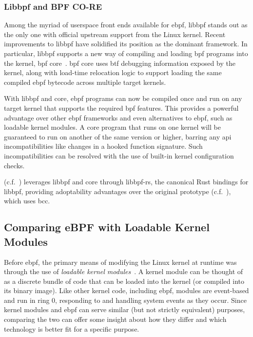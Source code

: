 \subsubsection*{Libbpf and BPF CO-RE}%

Among the myriad of userspace front ends available for \gls{ebpf}, libbpf stands out as the only
one with official upstream support from the Linux kernel. Recent improvements to libbpf
have solidified its position as the dominant framework. In particular, libbpf supports
a new way of compiling and loading \gls{bpf} programs into the kernel, \gls{bpf}
\gls{core}~\cite{gregg2020_core, nakryiko2020_core}. \gls{bpf} \gls{core} uses \gls{btf}
debugging information exposed by the kernel, along with load-time relocation logic to
support loading the same compiled \gls{ebpf} bytecode across multiple target kernels.

With libbpf and \gls{core}, \gls{ebpf} programs can now be compiled once and run on any target kernel
that supports the required \gls{bpf} features. This provides a powerful advantage over other
\gls{ebpf} frameworks and even alternatives to \gls{ebpf}, such as loadable kernel modules. A \gls{core}
program that runs on one kernel will be guaranteed to run on another of the same version
or higher, barring any \gls{api} incompatibilities like changes in a hooked function signature.
Such incompatibilities can be resolved with the use of built-in kernel configuration
checks.

\bpfcontain{} (c.f.\ ) leverages libbpf and \gls{core} through libbpf-rs, the
canonical Rust bindings for libbpf, providing adoptability advantages over the original
\bpfbox{} prototype (c.f.\ ), which uses bcc.

\subsection{Comparing eBPF with Loadable Kernel Modules}%
\label{ss:bpf-vs-modules}

Before \gls{ebpf}, the primary means of modifying the Linux kernel at runtime was through the
use of \textit{loadable kernel modules}~\cite{corbet1998_device_drivers}. A kernel module
can be thought of as a discrete bundle of code that can be loaded into the kernel (or
compiled into its binary image). Like other kernel code, including \gls{ebpf}, modules are
event-based and run in ring 0, responding to and handling system events as they occur.
Since kernel modules and \gls{ebpf} can serve similar (but not strictly equivalent) purposes,
comparing the two can offer some insight about how they differ and which technology is
better fit for a specific purpose.

